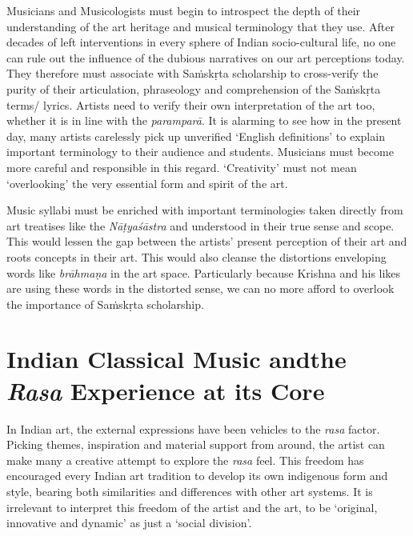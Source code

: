 Musicians and Musicologists must begin to introspect the depth of their understanding of the art heritage and musical terminology that they use. After decades of left interventions in every sphere of Indian socio-cultural life, no one can rule out the influence of the dubious narratives on our art perceptions today. They therefore must associate with Saṁskṛta scholarship to cross-verify the purity of their articulation, phraseology and comprehension of the Saṁskṛta terms/ lyrics. Artists need to verify their own interpretation of the art too, whether it is in line with the \textit{paramparā}. It is alarming to see how in the present day, many artists carelessly pick up unverified ‘English definitions’ to explain important terminology to their audience and students. Musicians must become more careful and responsible in this regard. ‘Creativity’ must not mean ‘overlooking’ the very essential form and spirit of the art.

Music syllabi must be enriched with important terminologies taken directly from art treatises like the \textit{Nāṭyaśāstra} and understood in their true sense and scope. This would lessen the gap between the artists’ present perception of their art and roots concepts in their art. This would also cleanse the distortions enveloping words like \textit{brāhmaṇa} in the art space. Particularly because Krishna and his likes are using these words in the distorted sense, we can no more afford to overlook the importance of Saṁskṛta scholarship.

\vspace{-.3cm}

\section*{Indian Classical Music and\hfill \break the \textit{Rasa} Experience at its Core}

In Indian art, the external expressions have been vehicles to the \textit{rasa} factor. Picking themes, inspiration and material support from around, the artist can make many a creative attempt to explore the \textit{rasa} feel. This freedom has encouraged every Indian art tradition to develop its own indigenous form and style, bearing both similarities and differences with other art systems. It is irrelevant to interpret this freedom of the artist and the art, to be ‘original, innovative and dynamic’ as just a ‘social division’.

